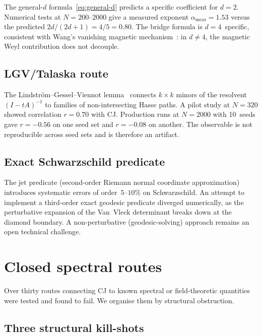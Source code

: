 \documentclass[12pt,a4paper]{article}
\theoremstyle{plain}
\theoremstyle{definition}
\theoremstyle{remark}
\begin{document}
The general-$d$ formula~\eqref{eq:general-d} predicts a specific
coefficient for $d = 2$.  Numerical tests at $N = 200$--$2000$
give a measured exponent $\alpha_{\mathrm{meas}} = 1.53$ versus
the predicted $2d/(2d+1) = 4/5 = 0.80$.  The bridge formula is
$d = 4$~specific, consistent with Wang's vanishing magnetic
mechanism~\cite{Wang:2019}: in $d \neq 4$, the magnetic Weyl
contribution does not decouple.

\subsection{LGV/Talaska route}
\label{sec:lgv}

The Lindstr\"om--Gessel--Viennot
lemma~\cite{GesselViennot:1985} connects $k \times k$ minors of
the resolvent $(I - tA)^{-1}$ to families of non-intersecting
Hasse paths.  A pilot study at $N = 320$ showed correlation
$r = 0.70$ with CJ.  Production runs at $N = 2000$ with 10~seeds
gave $r = -0.56$ on one seed set and $r = -0.08$ on another.  The
observable is not reproducible across seed sets and is therefore
an artifact.

\subsection{Exact Schwarzschild predicate}
\label{sec:exact-sch}

The jet predicate (second-order Riemann normal coordinate
approximation) introduces systematic errors of order~$5$--$10\%$
on Schwarzschild.  An attempt to implement a third-order exact
geodesic predicate diverged numerically, as the perturbative
expansion of the Van~Vleck determinant breaks down at the diamond
boundary.  A non-perturbative (geodesic-solving) approach remains
an open technical challenge.

\section{Closed spectral routes}
\label{sec:closed}

Over thirty routes connecting CJ to known spectral or
field-theoretic quantities were tested and found to fail.  We
organise them by structural obstruction.

\subsection{Three structural kill-shots}
\label{sec:killshots}
\end{document}
